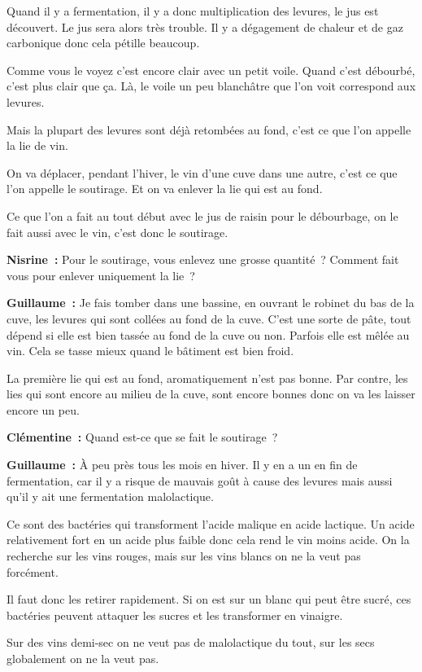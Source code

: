 \documentclass[a4paper, titlepage]{report}
\begin{document}
Quand il y a fermentation, il y a donc multiplication des levures, le
jus est découvert. Le jus sera alors très trouble. Il y a dégagement de
chaleur et de gaz carbonique donc cela pétille beaucoup.

Comme vous le voyez c'est encore clair avec un petit voile.
Quand c'est débourbé, c'est plus clair que ça. Là, le voile un peu
blanchâtre que l'on voit correspond aux levures.

Mais la plupart des levures sont déjà retombées au fond, c'est ce que
l'on appelle la lie de vin.

On va déplacer, pendant l'hiver, le vin d'une cuve dans une autre, c'est
ce que l'on appelle le soutirage. Et on va enlever la lie qui est au
fond.

Ce que l'on a fait au tout début avec le jus de raisin pour le
débourbage, on le fait aussi avec le vin, c'est donc le soutirage.

\textbf{Nisrine~:} Pour le soutirage, vous enlevez une grosse quantité~?
Comment fait vous pour enlever uniquement la lie~?

\textbf{Guillaume~:} Je fais tomber dans une bassine, en ouvrant le
robinet du bas de la cuve, les levures qui sont collées au fond de la
cuve. C'est une sorte de pâte, tout dépend si elle est bien tassée au
fond de la cuve ou non. Parfois elle est mêlée au vin. Cela se tasse
mieux quand le bâtiment est bien froid.

La première lie qui est au fond, aromatiquement n'est pas bonne. Par
contre, les lies qui sont encore au milieu de la cuve, sont encore
bonnes donc on va les laisser encore un peu.

\textbf{Clémentine~:} Quand est-ce que se fait le soutirage~?

\textbf{Guillaume~:} À peu près tous les mois en hiver. Il y en a un en
fin de fermentation, car il y a risque de mauvais goût à cause des
levures mais aussi qu'il y ait une fermentation malolactique.

Ce sont des bactéries qui transforment l'acide malique en acide
lactique. Un acide relativement fort en un acide plus faible donc cela
rend le vin moins acide. On la recherche sur les vins rouges, mais sur
les vins blancs on ne la veut pas forcément.

Il faut donc les retirer rapidement. Si on est sur un blanc qui peut
être sucré, ces bactéries peuvent attaquer les sucres et les transformer
en vinaigre.

Sur des vins demi-sec on ne veut pas de malolactique du tout, sur les
secs globalement on ne la veut pas.
\end{document}

